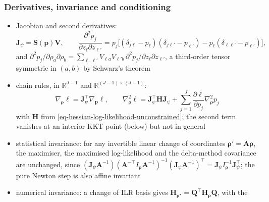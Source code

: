 \subsubsection{Derivatives, invariance and conditioning}
\label{app:chart-derivatives}

\begin{itemize}
  \item Jacobian and second derivatives:
        \begin{equation}
          \mathbf{J}_{\psi}=\boldsymbol{S}(\boldsymbol{p})\mathbf{V},
          \qquad
          \frac{\partial^{2}p_{j}}{\partial z_{\ell}\partial z_{\ell'}}
          =p_{j}\bigl[(\delta_{j\ell}-p_{\ell})(\delta_{j\ell'}-p_{\ell'})-p_{\ell}(\delta_{\ell\ell'}-p_{\ell'})\bigr],
          \label{eq-mapping-function-gradient}
        \end{equation}
        and \(\partial^{2}p_{j}/\partial\rho_{a}\partial\rho_{b}=\sum_{\ell,\ell'}V_{\ell a}V_{\ell' b}\,\partial^{2}p_{j}/\partial z_{\ell}\partial z_{\ell'}\),
        a third-order tensor symmetric in \((a,b)\) by Schwarz's theorem
  \item chain rules, in \(\mathbb{R}^{J-1}\) and \(\mathbb{R}^{(J-1)\times(J-1)}\):
        \begin{equation}
          \nabla_{\boldsymbol{\rho}}\ell=\mathbf{J}_{\psi}^{\top}\nabla_{\boldsymbol{p}}\ell,
          \qquad
          \nabla^{2}_{\boldsymbol{\rho}}\ell=\mathbf{J}_{\psi}^{\top}\mathbf{H}\mathbf{J}_{\psi}
          +\sum_{j=1}^{J}\frac{\partial\ell}{\partial p_{j}}\nabla^{2}_{\boldsymbol{\rho}}p_{j}
          \label{eq-chain-rule-second-order}
        \end{equation}
        with \(\mathbf{H}\) from \eqref{eq-hessian-log-likelihood-unconstrained}; the second term vanishes at an
        interior KKT point (below) but not in general
  \item statistical invariance: for any invertible linear change of coordinates
        \(\boldsymbol{\rho}'=\boldsymbol{A}\boldsymbol{\rho}\), the maximiser, the maximised log-likelihood and the delta-method
        covariance are unchanged, since
        \((\mathbf{J}_{\psi}\boldsymbol{A}^{-1})(\boldsymbol{A}^{-\top}I_{\boldsymbol{\rho}}\boldsymbol{A}^{-1})^{-1}(\mathbf{J}_{\psi}\boldsymbol{A}^{-1})^{\top}=\mathbf{J}_{\psi}I_{\boldsymbol{\rho}}^{-1}\mathbf{J}_{\psi}^{\top}\);
        the pure Newton step is also affine invariant \cite{boydConvexOptimization2004}
  \item numerical invariance: a change of ILR basis gives \(\mathbf{H}_{\boldsymbol{\rho}^{\star}}=\boldsymbol{Q}^{\top}\mathbf{H}_{\boldsymbol{\rho}}\boldsymbol{Q}\), with the

\end{itemize}

